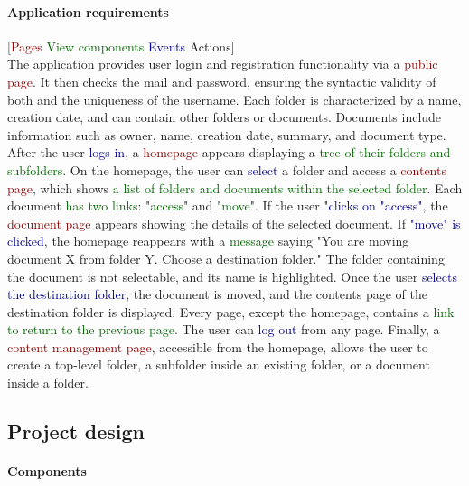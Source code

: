 \documentclass[a4paper,12pt]{article}
\newcommand{\myparagraph}[1]{\paragraph{#1}\mbox{}\\}
\begin{document}
\paragraph{Application requirements}
[\textcolor{darkred}{Pages} \textcolor{darkgreen}{View components} \textcolor{darkblue}{Events} \textcolor{darkyellow}{Actions}]\\
The application provides user \textcolor{darkyellow}{login} and \textcolor{darkyellow}{registration} functionality via a \textcolor{darkred}{public page}. It then \textcolor{darkyellow}{checks the mail and password}, ensuring the syntactic validity of both and the \textcolor{darkyellow}{uniqueness of the username}. Each folder is characterized by a name, creation date, and can contain other folders or documents. Documents include information such as owner, name, creation date, summary, and document type. After the user \textcolor{darkblue}{logs in}, a \textcolor{darkred}{homepage} appears displaying a \textcolor{darkgreen}{tree of their folders and subfolders}.
On the homepage, the user can \textcolor{darkblue}{select} a folder and \textcolor{darkyellow}{access} a \textcolor{darkred}{contents page}, which shows \textcolor{darkgreen}{a list of folders and documents within the selected folder}. Each document \textcolor{darkgreen}{has two links}: "\textcolor{darkgreen}{access}" and "\textcolor{darkgreen}{move}". If the user "\textcolor{darkblue}{clicks on "access"}, the \textcolor{darkred}{document page} appears showing the details of the selected document. If \textcolor{darkblue}{"move" is clicked}, the homepage reappears with a \textcolor{darkgreen}{message} saying "You are moving document X from folder Y. Choose a destination folder." The folder containing the document is not selectable, and its name is highlighted. Once the user \textcolor{darkblue}{selects the destination folder}, \textcolor{darkyellow}{the document is moved}, and the contents page of the destination folder is displayed. Every page, except the homepage, contains a \textcolor{darkgreen}{link to return to the previous page}. The user can \textcolor{darkblue}{log out} from any page. Finally, a \textcolor{darkred}{content management page}, accessible from the homepage, allows the user to \textcolor{darkyellow}{create a top-level folder, a subfolder inside an existing folder, or a document inside a folder}.
\newpage

\subsection{Project design}
\myparagraph{Components}
\end{document}
